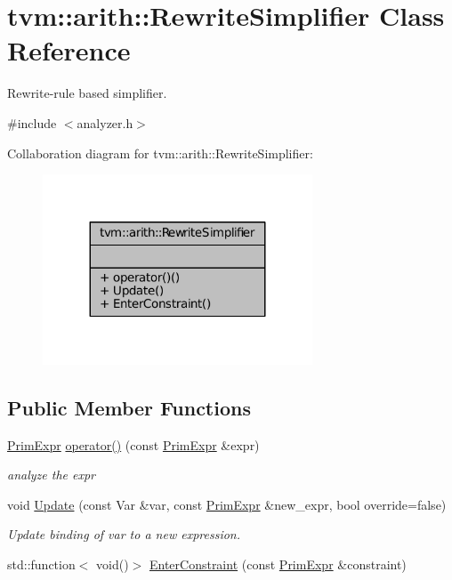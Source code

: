 \hypertarget{classtvm_1_1arith_1_1RewriteSimplifier}{}\section{tvm\+:\+:arith\+:\+:Rewrite\+Simplifier Class Reference}
\label{classtvm_1_1arith_1_1RewriteSimplifier}


Rewrite-\/rule based simplifier.  




{\ttfamily \#include $<$analyzer.\+h$>$}



Collaboration diagram for tvm\+:\+:arith\+:\+:Rewrite\+Simplifier\+:
\nopagebreak
\begin{figure}[H]
\begin{center}
\leavevmode
\includegraphics[width=227pt]{classtvm_1_1arith_1_1RewriteSimplifier__coll__graph}
\end{center}
\end{figure}
\subsection*{Public Member Functions}
\begin{DoxyCompactItemize}
\item 
\hyperlink{classtvm_1_1PrimExpr}{Prim\+Expr} \hyperlink{classtvm_1_1arith_1_1RewriteSimplifier_af91d307afc0c857751171a68d6d2b043}{operator()} (const \hyperlink{classtvm_1_1PrimExpr}{Prim\+Expr} \&expr)
\begin{DoxyCompactList}\small\item\em analyze the expr \end{DoxyCompactList}\item 
void \hyperlink{classtvm_1_1arith_1_1RewriteSimplifier_aee416032864cfb254226f00a46f5ac92}{Update} (const Var \&var, const \hyperlink{classtvm_1_1PrimExpr}{Prim\+Expr} \&new\+\_\+expr, bool override=false)
\begin{DoxyCompactList}\small\item\em Update binding of var to a new expression. \end{DoxyCompactList}\item 
std\+::function$<$ void()$>$ \hyperlink{classtvm_1_1arith_1_1RewriteSimplifier_a01dda385f4e0bb0e1155c76c2d28cb96}{Enter\+Constraint} (const \hyperlink{classtvm_1_1PrimExpr}{Prim\+Expr} \&constraint)
\end{DoxyCompactItemize}
